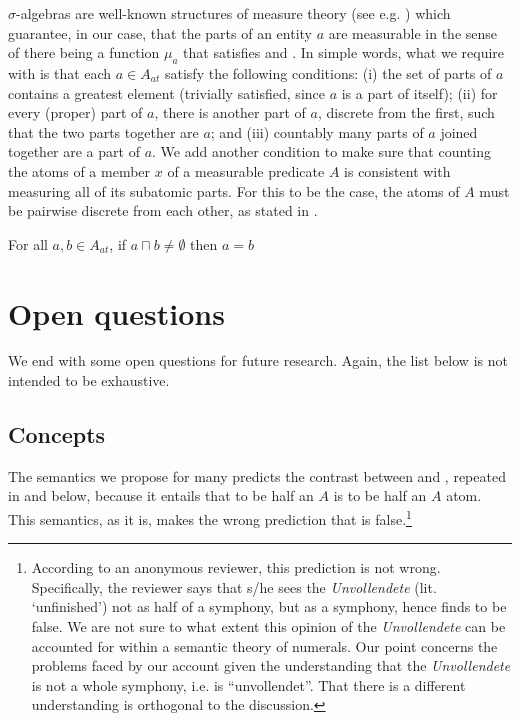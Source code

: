 \documentclass[output=paper]{langscibook}
\begin{document}
\noindent $\sigma$-algebras are well-known structures of measure theory (see e.g. \citealt{Cohn:1980}) which guarantee, in our case, that the parts of an entity $a$ are measurable in the sense of there being a function $\mu_a$ that satisfies  and . In simple words, what we require with  is that each $a \in A_{at}$ satisfy the following conditions: (i) the set of parts of $a$ contains a greatest element (trivially satisfied, since $a$ is a part of itself); (ii) for every (proper) part of $a$, there is another part of $a$, discrete from the first, such that the two parts together are $a$; and (iii) countably many parts of $a$ joined together are a part of $a$. We add another condition to make sure that counting the atoms of a member $x$ of a measurable predicate $A$ is consistent with measuring all of its subatomic parts. For this to be the case, the atoms of $A$ must be pairwise discrete from each other, as stated in .

\ea For all $a, b \in A_{at}$, if $a\sqcap b\ne\emptyset$ then $a=b$\label{hai-tri:condition-subatomic-parts}
\z

\section{Open questions}

We end with some open questions for future research. Again, the list below is not intended to be exhaustive. 

\subsection{Concepts}  

The semantics we propose for {\sc many} predicts the contrast between  and , repeated in  and  below, because it entails that to be half an $A$ is to be half an $A$ atom. This semantics, as it is, makes the wrong prediction that  is false.\footnote{According to an anonymous reviewer, this prediction is not wrong. Specifically, the reviewer says that s/he sees the \textit{Unvollendete} (lit. `unfinished') not as half of a symphony, but as a symphony, hence finds  to be false. We are not sure to what extent this opinion of the \textit{Unvollendete} can be accounted for within a semantic theory of numerals. Our point concerns the problems faced by our account given the understanding that the \textit{Unvollendete} is not a whole symphony, i.e. is ``unvollendet''. That there is a different understanding is orthogonal to the discussion.}
\end{document}
